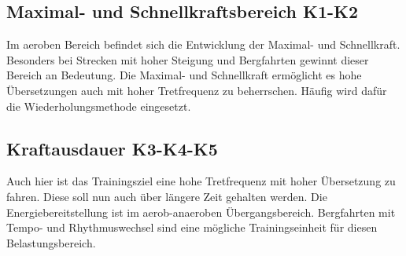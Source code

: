 \subsection{Maximal- und Schnellkraftsbereich K1-K2}
Im aeroben Bereich befindet sich die Entwicklung der Maximal- und Schnellkraft. Besonders bei Strecken mit hoher Steigung und Bergfahrten gewinnt dieser Bereich an Bedeutung. Die Maximal- und Schnellkraft ermöglicht es hohe Übersetzungen auch mit hoher Tretfrequenz zu beherrschen. Häufig wird dafür die Wiederholungsmethode eingesetzt.
\subsection{Kraftausdauer K3-K4-K5}
Auch hier ist das Trainingsziel eine hohe Tretfrequenz mit hoher Übersetzung zu fahren. Diese soll nun auch über längere Zeit gehalten werden. Die Energiebereitstellung ist im aerob-anaeroben Übergangsbereich. Bergfahrten mit Tempo- und Rhythmuswechsel sind eine mögliche Trainingseinheit für diesen Belastungsbereich. \par

